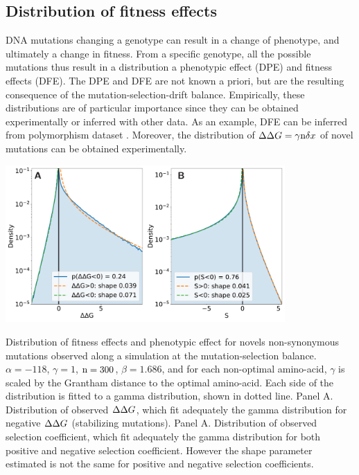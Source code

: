 \documentclass{article}
\begin{document}
\subsection*{Distribution of fitness effects}
DNA mutations changing a genotype can result in a change of phenotype, and ultimately a change in fitness.
From a specific genotype, all the possible mutations thus result in a distribution a phenotypic effect (DPE) and fitness effects (DFE).
The DPE and DFE are not known a priori, but are the resulting consequence of the mutation-selection-drift balance.
Empirically, these distributions are of particular importance since they can be obtained experimentally or inferred with other data.
As an example, DFE can be inferred from polymorphism dataset \cite{Eyre-walker2007, Galtier2016}. 
Moreover, the distribution of $\Delta \Delta G=\gamma \text{n} \delta x$ of novel mutations can be obtained experimentally.

\begin{center}
	\includegraphics[width=0.8\textwidth] {artworks/DPE-DFE.pdf}
\end{center}

Distribution of fitness effects and phenotypic effect for novels non-synonymous mutations observed along a simulation at the mutation-selection balance. $\alpha=-118$, $\gamma=1$, $\text{n}=300$, $\beta=1.686$, and for each non-optimal amino-acid, $\gamma$ is scaled by the Grantham distance to the optimal amino-acid.
Each side of the distribution is fitted to a gamma distribution, shown in dotted line. 
Panel A. Distribution of observed $\Delta \Delta G$, which fit adequately the gamma distribution for negative $\Delta \Delta G$ (stabilizing mutations). 
Panel A. Distribution of observed selection coefficient, which fit adequately the gamma distribution for both positive and negative selection coefficient. However the shape parameter estimated is not the same for positive and negative selection coefficients. 




\end{document}
